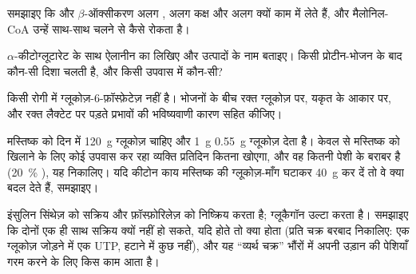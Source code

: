 \begin{exercise}[$\star\star$]\label{exo:b1:biosyntheses-integration:7}
समझाइए कि  और $\beta$-ऑक्सीकरण अलग , अलग कक्ष और
अलग  क्यों काम में लेते हैं, और मैलोनिल-CoA उन्हें साथ-साथ चलने
से कैसे रोकता है।
\end{exercise}

\begin{exercise}[$\star\star$]\label{exo:b1:biosyntheses-integration:8}
$\alpha$-कीटोग्लूटारेट के साथ ऐलानीन का  लिखिए और उत्पादों के
नाम बताइए। किसी प्रोटीन-भोजन के बाद कौन-सी दिशा चलती है, और किसी उपवास
में कौन-सी?
\end{exercise}

\begin{exercise}[$\star\star$]\label{exo:b1:biosyntheses-integration:9}
किसी रोगी में ग्लूकोज़-6-फ़ॉस्फ़ेटेज़ नहीं है। भोजनों के बीच रक्त
ग्लूकोज़ पर, यकृत के आकार पर, और रक्त लैक्टेट पर पड़ते प्रभावों की
भविष्यवाणी कारण सहित कीजिए।
\end{exercise}

\begin{exercise}[$\star\star\star$]\label{exo:b1:biosyntheses-integration:10}
मस्तिष्क को दिन में \qty{120}{g} ग्लूकोज़ चाहिए और \qty{1}{g} 
\qty{0.55}{g} ग्लूकोज़ देता है। केवल  से मस्तिष्क को खिलाने के
लिए कोई उपवास कर रहा व्यक्ति प्रतिदिन कितना  खोएगा, और वह कितनी
पेशी के बराबर है (\qty{20}{\%} ), यह निकालिए। यदि कीटोन काय
मस्तिष्क की ग्लूकोज़-माँग घटाकर \qty{40}{g} कर दें तो वे क्या बदल देते
हैं, समझाइए।
\end{exercise}

\begin{exercise}[$\star\star\star$]\label{exo:b1:biosyntheses-integration:11}
इंसुलिन  सिंथेज़ को सक्रिय और 
फ़ॉस्फ़ोरिलेज़ को निष्क्रिय करता है; ग्लूकैगॉन उल्टा करता है। समझाइए कि
दोनों एक ही साथ सक्रिय क्यों नहीं हो सकते, यदि होते तो क्या होता (प्रति
चक्र बरबाद  निकालिए: एक ग्लूकोज़ जोड़ने में एक UTP, हटाने में कुछ
नहीं), और यह ``व्यर्थ चक्र'' भौंरों में अपनी उड़ान की पेशियाँ गरम करने
के लिए किस काम आता है।
\end{exercise}


